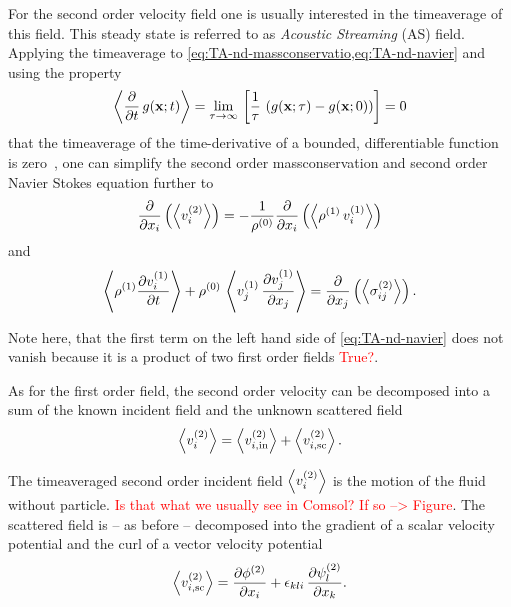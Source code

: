 For the second order velocity field one is usually interested in the 
timeaverage of this field. This steady state is referred to as \emph{Acoustic 
Streaming} (AS) field. Applying the timeaverage to 
\cref{eq:TA-nd-massconservatio,eq:TA-nd-navier} and using the property
\begin{equation}
  \left\langle \pdv{t}\,g(\vb{x};t) \right\rangle = \lim\limits_{\tau \rightarrow \infty}{\,
    \left[ \frac{1}{\tau}\,\left( g(\vb{x}; \tau) - g(\vb{x}; 0) \right) 
  \right]} = 0
  \label{eq:TA-avg-property}
\end{equation}
that the timeaverage of the time-derivative of a bounded, differentiable 
function is zero~\cite{Baasch2020}, one can simplify the second order 
massconservation and second order Navier Stokes equation further to
\begin{equation}
  \pdv{x_{i}}\left( \left\langle v_{i}^{(2)} \right\rangle \right) = 
  -\frac{1}{\rho^{(0)}} \pdv{x_{i}}\left(\left\langle  
  \rho^{(1)}\,v_{i}^{(1)}  \right\rangle\right)
  \label{eq:TA-avg-massconservatio}
\end{equation}
and
\begin{equation}
  \left\langle \rho^{(1)} \pdv{  v_{i}^{(1)}  }{t} \right\rangle + 
  \rho^{(0)}\,\left\langle v_{j}^{(1)}\,\pdv{  v_{j}^{(1)}  }{x_{j}} \right\rangle 
  = \pdv{x_{j}}\left( \left\langle \sigma_{ij}^{(2)} \right\rangle \right).
  \label{eq:TA-avg-navier}
\end{equation}

Note here, that the first term on the left hand side of \cref{eq:TA-nd-navier} 
does not vanish because it is a product of two first order fields 
\textcolor{red}{True?}.

As for the first order field, the second order velocity can be decomposed into 
a sum of the known incident field and the unknown scattered field
\begin{equation}
  \left\langle v_{i}^{(2)} \right\rangle =
    \left\langle v_{i,\mathrm{in}}^{(2)} \right\rangle +
    \left\langle v_{i,\mathrm{sc}}^{(2)} \right\rangle.
  \label{eq:TA-nd-velocity}
\end{equation}

The timeaveraged second order incident field $\left\langle v_{i}^{(2)} \right\rangle$ 
is the motion of the fluid without particle. \textcolor{red}{Is that what we 
usually see in Comsol? If so --> Figure}. The scattered field is -- as before 
-- decomposed into the gradient of a scalar velocity potential and the curl of 
a vector velocity potential
\begin{equation}
  \left\langle v_{i,\mathrm{sc}}^{(2)} \right\rangle =
  \pdv{  \phi^{(2)}  }{x_{i}} + 
  \epsilon_{kli}\,\pdv{  \psi^{(2)}  _{l}}{x_{k}}.
  \label{eq:TA-nd-sc-decomposition}
\end{equation}

